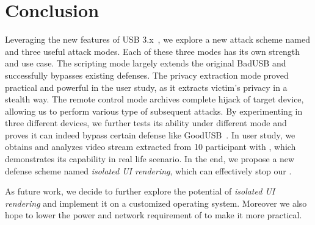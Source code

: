 \section{Conclusion}
\label{sec:conclusion}
Leveraging the new features of USB 3.x~\cite{usb31,usb31,usb32}, we explore a new attack scheme named \tool and three useful attack modes. Each of these three modes has its own strength and use case. The scripting mode largely extends the original BadUSB and successfully bypasses existing defenses. The privacy extraction mode proved practical and powerful in the user study, as it extracts victim's privacy in a stealth way. The remote control mode archives complete hijack of target device, allowing us to perform various type of subsequent attacks. By experimenting \tool in three different devices, we further tests its ability under different mode and proves it can indeed bypass certain defense like GoodUSB~\cite{tian2015defending}. In user study, we obtains and analyzes video stream extracted from 10 participant with \tool, which demonstrates its capability in real life scenario. In the end, we propose a new defense scheme named \textit{isolated UI rendering}, which can effectively stop our \tool.

As future work, we decide to further explore the potential of \textit{isolated UI rendering} and implement it on a customized operating system. Moreover we also hope to lower the power and network requirement of \tool to make it more practical.
